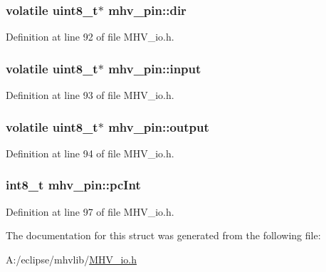 \hypertarget{structmhv__pin_af92bee18d70be924e19ce2d2a6a7b14c}{
\subsubsection[{dir}]{\setlength{\rightskip}{0pt plus 5cm}volatile uint8\-\_\-t$\ast$ {\bf mhv\-\_\-pin\-::dir}}}
\label{structmhv__pin_af92bee18d70be924e19ce2d2a6a7b14c}


\-Definition at line 92 of file \-M\-H\-V\-\_\-io.\-h.

\hypertarget{structmhv__pin_a7c545d8bf340b11c799df9bc2c998076}{
\subsubsection[{input}]{\setlength{\rightskip}{0pt plus 5cm}volatile uint8\-\_\-t$\ast$ {\bf mhv\-\_\-pin\-::input}}}
\label{structmhv__pin_a7c545d8bf340b11c799df9bc2c998076}


\-Definition at line 93 of file \-M\-H\-V\-\_\-io.\-h.

\hypertarget{structmhv__pin_a5c5f34f91b6586d0603e9568900f8423}{
\subsubsection[{output}]{\setlength{\rightskip}{0pt plus 5cm}volatile uint8\-\_\-t$\ast$ {\bf mhv\-\_\-pin\-::output}}}
\label{structmhv__pin_a5c5f34f91b6586d0603e9568900f8423}


\-Definition at line 94 of file \-M\-H\-V\-\_\-io.\-h.

\hypertarget{structmhv__pin_a10252efa71e71a7e0e5ddb1d184c7101}{
\subsubsection[{pc\-Int}]{\setlength{\rightskip}{0pt plus 5cm}int8\-\_\-t {\bf mhv\-\_\-pin\-::pc\-Int}}}
\label{structmhv__pin_a10252efa71e71a7e0e5ddb1d184c7101}


\-Definition at line 97 of file \-M\-H\-V\-\_\-io.\-h.



\-The documentation for this struct was generated from the following file\-:\begin{DoxyCompactItemize}
\item 
\-A\-:/eclipse/mhvlib/\hyperlink{_m_h_v__io_8h}{\-M\-H\-V\-\_\-io.\-h}\end{DoxyCompactItemize}

